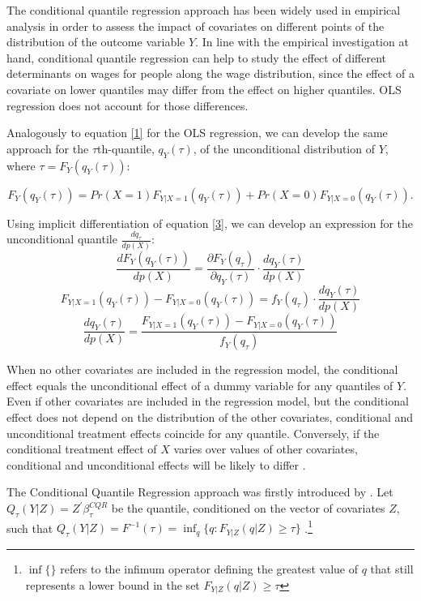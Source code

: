 The conditional quantile regression approach has been widely used in empirical analysis in order to assess the impact of covariates on different points of the distribution of the outcome variable $Y$. In line with the empirical investigation at hand, conditional quantile regression can help to study the effect of different determinants on wages for people along the wage distribution, since the effect of a covariate on lower quantiles may differ from the effect on higher quantiles. OLS regression does not account for those differences.

Analogously to equation \ref{1} for the OLS regression, we can develop the same approach for the $\tau$th-quantile, $q_{Y}(\tau)$, of the unconditional distribution of $Y$, where $\tau=F_{Y}(q_{Y}(\tau))$:

\begin{equation}\label{3}
  F_{Y}(q_{Y}(\tau))=Pr(X=1)F_{Y|X=1}(q_{Y}(\tau))+Pr(X=0)F_{Y|X=0}(q_{Y}(\tau)).
\end{equation}

Using implicit differentiation of equation \ref{3}, we can develop an expression for the unconditional quantile $\frac{dq_{\tau}}{dp(X)}$:
\begin{equation*}
  \frac{dF_{Y}(q_{Y}(\tau))}{dp(X)}=\frac{\partial F_{Y}(q_{\tau})}{\partial q_{Y}(\tau)}\cdot \frac{dq_{Y}(\tau)}{dp(X)}
\end{equation*}
\begin{equation*}
  F_{Y|X=1}(q_{Y}(\tau))-F_{Y|X=0}(q_{Y}(\tau))=f_{Y}(q_{\tau})\cdot \frac{dq_{Y}(\tau)}{dp(X)}
\end{equation*}
\begin{equation}\label{4}
  \frac{dq_{Y}(\tau)}{dp(X)}=\frac{F_{Y|X=1}(q_{Y}(\tau))-F_{Y|X=0}(q_{Y}(\tau))}{f_{Y}(q_{\tau})}
\end{equation}

When no other covariates are included in the regression model, the conditional effect equals the unconditional effect of a dummy variable for any quantiles of $Y$. Even if other covariates are included in the regression model, but the conditional effect does not depend on the distribution of the other covariates, conditional and unconditional treatment effects coincide for any quantile. Conversely, if the conditional treatment effect of $X$ varies over values of other covariates, conditional and unconditional effects will be likely to differ \citep{Borah&Basu:2013}.

The Conditional Quantile Regression approach was firstly introduced by \cite{Koenker&Bassett:1978}. Let $Q_{\tau}(Y|Z) = Z^{'}\beta_{\tau}^{CQR}$ be the quantile, conditioned on the vector of covariates $Z$, such that $Q_{\tau}(Y|Z)=F^{-1}(\tau)=\inf_{q}\{q:F_{Y|Z}(q|Z)\geq\tau\}$ \citep{Borah&Basu:2013}.\footnote{ $\inf\{\}$ refers to the infimum operator defining the greatest value of $q$ that still represents a lower bound in the set $F_{Y|Z}(q|Z)\geq\tau$}

